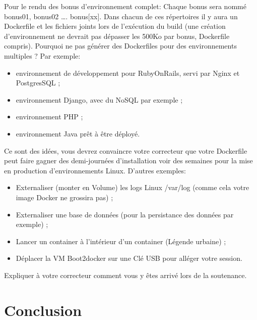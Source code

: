 \documentclass{42}
\begin{document}
Pour le rendu des bonus d'environnement complet:
\newline
Chaque bonus sera nommé bonus01, bonus02 …. bonus[xx].
\newline
\newline
Dans chacun de ces répertoires il y aura un Dockerfile et les fichiers joints lors de l’exécution du build (une création d'environnement ne devrait pas dépasser les 500Ko par bonus, Dockerfile compris).
\newline
\newline
Pourquoi ne pas générer des Dockerfiles pour des environnements multiples ? Par exemple:
\newline
\begin{itemize}
	\item environnement de développement pour RubyOnRails, servi par Nginx et PostgresSQL ;
	\item environnement Django, avec du NoSQL par exemple ;
	\item environnement PHP ;
	\item environnement Java prêt à être déployé.
\end{itemize}
Ce sont des idées, vous devrez convaincre votre correcteur que votre Dockerfile peut faire gagner des demi-journées d’installation voir des semaines pour la mise en production d'environnements Linux.
\newline
\newline
D’autres exemples:
\newline
\begin{itemize}
	\item Externaliser (monter en Volume) les logs Linux /var/log (comme cela votre image Docker ne grossira pas) ;
	\item Externaliser une base de données (pour la persistance des données par exemple) ;
	\item Lancer un container à l'intérieur d’un container (Légende urbaine) ;
	\item Déplacer la VM Boot2docker sur une Clé USB   pour alléger votre session.
\end{itemize}

Expliquer à votre correcteur comment vous y êtes arrivé lors de la soutenance.

	\newpage

\chapter{Conclusion}
\end{document}
